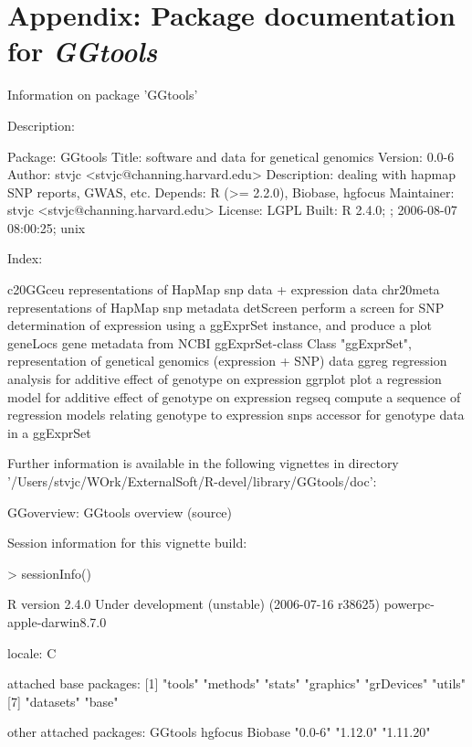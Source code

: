 \documentclass[12pt]{article}
\newcommand{\Rpackage}[1]{{\textit{#1}}}
\begin{document}
\section{Appendix: Package documentation for \Rpackage{GGtools}}
\begin{Schunk}
\begin{Soutput}
		Information on package 'GGtools'

Description:


Package:       GGtools
Title:         software and data for genetical genomics
Version:       0.0-6
Author:        stvjc <stvjc@channing.harvard.edu>
Description:   dealing with hapmap SNP reports, GWAS, etc.
Depends:       R (>= 2.2.0), Biobase, hgfocus
Maintainer:    stvjc <stvjc@channing.harvard.edu>
License:       LGPL
Built:         R 2.4.0; ; 2006-08-07 08:00:25; unix


Index:


c20GGceu                representations of HapMap snp data + expression
                        data
chr20meta               representations of HapMap snp metadata
detScreen               perform a screen for SNP determination of
                        expression using a ggExprSet instance, and
                        produce a plot
geneLocs                gene metadata from NCBI
ggExprSet-class         Class "ggExprSet", representation of genetical
                        genomics (expression + SNP) data
ggreg                   regression analysis for additive effect of
                        genotype on expression
ggrplot                 plot a regression model for additive effect of
                        genotype on expression
regseq                  compute a sequence of regression models
                        relating genotype to expression
snps                    accessor for genotype data in a ggExprSet


Further information is available in the following vignettes in
directory '/Users/stvjc/WOrk/ExternalSoft/R-devel/library/GGtools/doc':


GGoverview: GGtools overview (source)
\end{Soutput}
\end{Schunk}

Session information for this vignette build:
\begin{Schunk}
\begin{Sinput}
> sessionInfo()
\end{Sinput}
\begin{Soutput}
R version 2.4.0 Under development (unstable) (2006-07-16 r38625) 
powerpc-apple-darwin8.7.0 

locale:
C

attached base packages:
[1] "tools"     "methods"   "stats"     "graphics"  "grDevices" "utils"    
[7] "datasets"  "base"     

other attached packages:
  GGtools   hgfocus   Biobase 
  "0.0-6"  "1.12.0" "1.11.20" 
\end{Soutput}
\end{Schunk}
\end{document}
